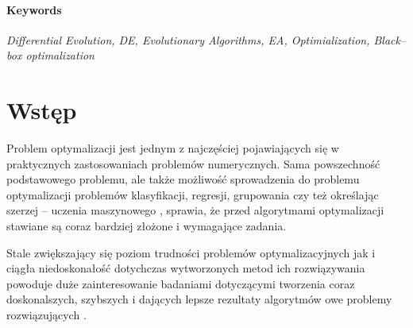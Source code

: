 \documentclass[11pt,a4paper]{report}
\begin{document}
\subsubsection{Keywords}
\par{
\emph{Differential Evolution, DE, Evolutionary Algorithms, EA, Optimialization, Black--box optimalization}
}

\chapter{Wstęp}
\par{
Problem optymalizacji jest jednym z najczęściej pojawiających się w praktycznych zastosowaniach problemów numerycznych. Sama powszechność podstawowego problemu, ale także możliwość sprowadzenia do problemu optymalizacji problemów klasyfikacji, regresji, grupowania czy też określając szerzej -- uczenia maszynowego \cite{SearchingInteligent,SpringerIntroToEvol}, sprawia, że przed algorytmami optymalizacji stawiane są coraz bardziej złożone i wymagające zadania.
}
\par{
Stale zwiększający się poziom trudności problemów optymalizacyjnych jak i ciągła niedoskonałość dotychczas wytworzonych metod ich rozwiązywania powoduje duże zainteresowanie badaniami dotyczącymi tworzenia coraz doskonalszych, szybszych i dających lepsze rezultaty algorytmów owe problemy rozwiązujących \cite{StateOfArt}.
}
\end{document}
